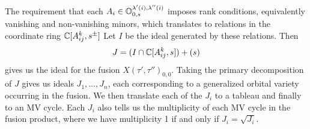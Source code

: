 \documentclass[draft]{article} %
\begin{document}


The requirement that each $A_i \in \mathbb O^{\lambda'(i), \lambda''(i)}_{0,s}$ imposes rank conditions, equivalently vanishing and non-vanishing minors, which translates to relations in the coordinate ring $\mathbb C[A_{ij}^k, s^\pm]$
Let $I$ be the ideal generated by these relations. Then $$J = (I \cap \mathbb C[A_{ij}^k,s]) + (s)$$ gives us the ideal for the fusion $ X(\tau', \tau'')_{0,0}$. Taking the primary decomposition of $J$ gives us ideals $J_1,\dots,J_n$, each corresponding to a generalized orbital variety occurring in the fusion. We then translate each of the $J_i$ to a tableau and finally to an MV cycle. Each $J_i$ also tells us the multiplicity of each MV cycle in the fusion product, where we have multiplicity 1 if and only if $J_i = \sqrt {J_i}$.




\end{document}
